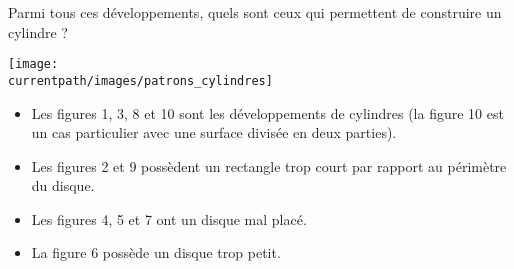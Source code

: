 \begin{exercice*}
   Parmi tous ces développements, quels sont ceux qui permettent de construire un cylindre ? \smallskip
   \begin{center}
      \texttt{[image: \\currentpath/images/patrons\_cylindres]}
   \end{center}
\end{exercice*}
\begin{corrige}
   \begin{itemize}
      \item Les figures {\color{red} 1, 3, 8 et 10 sont les développements de cylindres} (la figure 10 est un cas particulier avec une surface divisée en deux parties).
      \item Les figures 2 et 9 possèdent un rectangle trop court par rapport au périmètre du disque.
      \item Les figures 4, 5 et 7 ont un disque mal placé.
      \item La figure 6 possède un disque trop petit.
   \end{itemize}
\end{corrige}